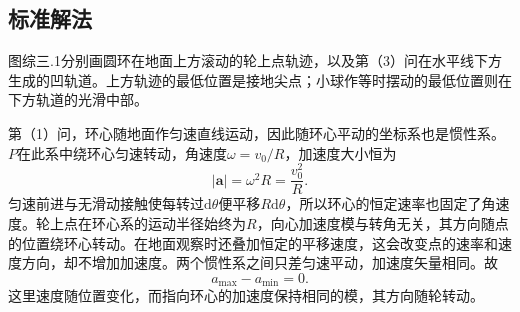 \documentclass[UTF8,fontset=fandol,a4paper,11pt]{ctexart}
\begin{document}
\subsection*{标准解法}


图综三.1分别画圆环在地面上方滚动的轮上点轨迹，以及第（3）问在水平线下方生成的凹轨道。上方轨迹的最低位置是接地尖点；小球作等时摆动的最低位置则在下方轨道的光滑中部。

第（1）问，环心随地面作匀速直线运动，因此随环心平动的坐标系也是惯性系。$P$在此系中绕环心匀速转动，角速度$\omega=v_0/R$，加速度大小恒为
\[
|\boldsymbol a|=\omega^2R=\frac{v_0^2}{R}.
\]
匀速前进与无滑动接触使每转过$\mathrm d\theta$便平移$R\mathrm d\theta$，所以环心的恒定速率也固定了角速度。轮上点在环心系的运动半径始终为$R$，向心加速度模与转角无关，其方向随点的位置绕环心转动。在地面观察时还叠加恒定的平移速度，这会改变点的速率和速度方向，却不增加加速度。两个惯性系之间只差匀速平动，加速度矢量相同。故
\[
\boxed{a_{\max}-a_{\min}=0}.
\]
这里速度随位置变化，而指向环心的加速度保持相同的模，其方向随轮转动。
\end{document}
